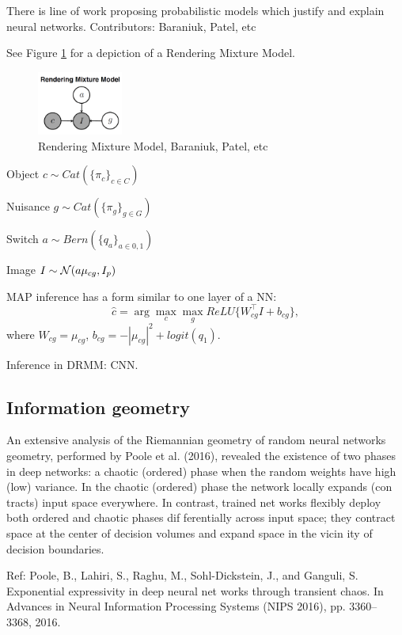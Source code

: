 \documentclass[english]{article}
\begin{document}
There is line of work proposing probabilistic models which justify and explain neural networks.  Contributors: Baraniuk, Patel, etc

See Figure \ref{rmm} for a depiction of a Rendering Mixture Model.

\begin{figure}
  \centering
  \includegraphics[width=0.25\textwidth]{rmm.png}
  \caption{Rendering Mixture Model, Baraniuk, Patel, etc}
  \label{rmm}
\end{figure}

\bitem
\item Object $c \sim Cat(\{\pi_c\}_{c\in C})$
\item Nuisance $g \sim Cat(\{\pi_g\}_{g\in G})$
\item Switch $a \sim Bern(\{q_a\}_{a\in 0,1})$
\item Image $I \sim \mathcal{N}(a\mu_{cg},I_p)$ 
\eitem

\begin{theorem}
MAP inference has a form similar to one layer of a NN:  $$\hat c = \arg\max_c \max_g ReLU\{W_{cg}^\top I+b_{cg}\},$$
where $W_{cg} = \mu_{cg}$, $b_{cg}  = - |\mu_{cg}|^2+logit(q_1)$.
\end{theorem}

Inference in DRMM: CNN. 

\subsection{Information geometry}


\benum
\item An extensive analysis of the Riemannian geometry of random neural networks  geometry, performed by Poole et al. (2016), revealed the existence of two phases in deep networks: a chaotic (ordered) phase
when the random weights have high (low) variance. In the
chaotic (ordered) phase the network locally expands (con
tracts) input space everywhere. In contrast, trained net
works flexibly deploy both ordered and chaotic phases dif
ferentially across input space; they contract space at the
center of decision volumes and expand space in the vicin
ity of decision boundaries. 

Ref: Poole, B., Lahiri, S., Raghu, M., Sohl-Dickstein, J., and
Ganguli, S. Exponential expressivity in deep neural net
works through transient chaos. In Advances in Neural
Information Processing Systems (NIPS 2016), pp. 3360–
3368, 2016.
\end{document}
